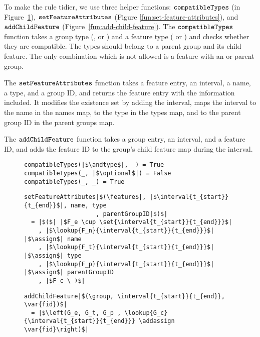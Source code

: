 To make the rule tidier, we use three helper functions: $\texttt{compatibleTypes}$ (in Figure~\ref{fun:compatible-types}), $\texttt{setFeatureAttributes}$ (Figure \vref{fun:set-feature-attributes}), and $\texttt{addChildFeature}$ (Figure~\vref{fun:add-child-feature}). The $\texttt{compatibleTypes}$ function takes a group type (\andtype{}, \ortype{} or \xortype{}) and a feature type (\mandatory{} or \optional{}) and checks whether they are compatible. The types should belong to a parent group and its child feature. The only combination which is not allowed is a \mandatory{} feature with an \xortype{} or \ortype{} parent group.

The $\texttt{setFeatureAttributes}$ function takes a feature entry, an interval, a name, a type, and a group ID, and returns the feature entry with the information included. It modifies the existence set by adding the interval, maps the interval to the name in the names map, to the type in the types map, and to the parent group ID in the parent groups map.

The $\texttt{addChildFeature}$ function takes a group entry, an interval, and a feature ID, and adds the feature ID to the group's child feature map during the interval.

\begin{figure}[h]
  \begin{verbatim}
compatibleTypes(|$\andtype$|, _) = True
compatibleTypes(_, |$\optional$|) = False
compatibleTypes(_, _) = True
  \end{verbatim}
  \caption{}
  \label{fun:compatible-types}
\end{figure}

\begin{figure}[h]
  \begin{verbatim}
setFeatureAttributes|$(\feature$|, |$\interval{t_{start}}{t_{end}}$|, name, type
                    , parentGroupID|$)$|
  = |$($| |$F_e \cup \set{\interval{t_{start}}{t_{end}}}$|
    , |$\lookup{F_n}{\interval{t_{start}}{t_{end}}}$| |$\assign$| name
    , |$\lookup{F_t}{\interval{t_{start}}{t_{end}}}$| |$\assign$| type
    , |$\lookup{F_p}{\interval{t_{start}}{t_{end}}}$| |$\assign$| parentGroupID
    , |$F_c \ )$|
   \end{verbatim}
  \caption{}
  \label{fun:set-feature-attributes}
\end{figure}

\begin{figure}[h]
  \begin{verbatim}
addChildFeature|$(\group, \interval{t_{start}}{t_{end}}, \var{fid})$|
  = |$\left(G_e, G_t, G_p , \lookup{G_c}{\interval{t_{start}}{t_{end}}} \addassign \var{fid}\right)$|
  \end{verbatim}
  \caption{}
  \label{fun:add-child-feature}
\end{figure}

